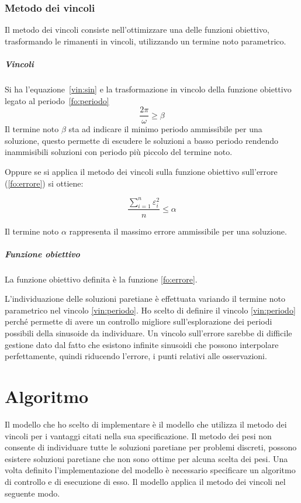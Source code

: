 \documentclass[a4paper,12pt]{report}
\begin{document}
\subsubsection{Metodo dei vincoli}
Il metodo dei vincoli consiste nell'ottimizzare una delle funzioni obiettivo, trasformando le rimanenti in vincoli, utilizzando un termine noto parametrico.

\subparagraph{Vincoli} Si ha l'equazione~\eqref{vin:sin} e la trasformazione in vincolo della funzione obiettivo legato al periodo~\eqref{fo:periodo}
\begin{equation}
\label{vin:periodo}
\frac{2\pi}{\omega} \ge \beta
\end{equation}
Il termine noto $ \beta $ sta ad indicare il minimo periodo ammissibile per una soluzione, questo permette di escudere le soluzioni a basso periodo rendendo inammisibili soluzioni con periodo più piccolo del termine noto.

Oppure se si applica il metodo dei vincoli sulla funzione obiettivo sull'errore (\ref{fo:errore}) si ottiene:

\begin{equation}
\label{vin:errore}
\frac{\sum_{i=1}^n \varepsilon_i^2}{n} \le \alpha
\end{equation}

Il termine noto $ \alpha $ rappresenta il massimo errore ammissibile per una soluzione.

\subparagraph{Funzione obiettivo}
La funzione obiettivo definita è la funzione \eqref{fo:errore}.

L'individuazione delle soluzioni paretiane è effettuata variando il termine noto parametrico nel vincolo \eqref{vin:periodo}.
Ho scelto di definire il vincolo \eqref{vin:periodo} perché permette di avere un controllo migliore sull'esplorazione dei periodi possibili della sinusoide da individuare. Un vincolo sull'errore sarebbe di difficile gestione dato dal fatto che esistono infinite sinusoidi che possono interpolare perfettamente, quindi riducendo l'errore, i punti relativi alle osservazioni.



\section{Algoritmo}
\label{ss:controllo}
Il modello che ho scelto di implementare è il modello che utilizza il metodo dei vincoli per i vantaggi citati nella sua specificazione.
Il metodo dei pesi non consente di individuare tutte le soluzioni paretiane per problemi discreti, possono esistere soluzioni paretiane che non sono ottime per alcuna scelta dei pesi.
Una volta definito l'implementazione del modello è necessario specificare un algoritmo di controllo e di esecuzione di esso.
Il modello applica il metodo dei vincoli nel seguente modo.
\end{document}
